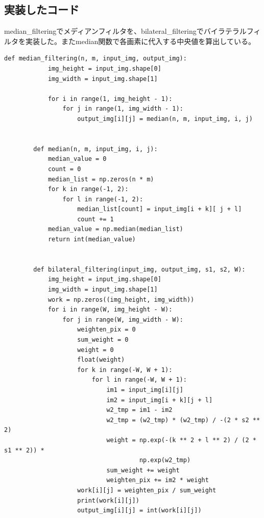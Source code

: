 \documentclass[11pt,a4j]{jsarticle}
\begin{document}
    \subsection{実装したコード}
    median\_filteringでメディアンフィルタを、bilateral\_filteringでバイラテラルフィルタを実装した。またmedian関数で各画素に代入する中央値を算出している。
    \begin{lstlisting}[basicstyle=\ttfamily\footnotesize, frame=single]
        def median_filtering(n, m, input_img, output_img):
            img_height = input_img.shape[0]
            img_width = input_img.shape[1]

            for i in range(1, img_height - 1):
                for j in range(1, img_width - 1):
                    output_img[i][j] = median(n, m, input_img, i, j)


        def median(n, m, input_img, i, j):
            median_value = 0
            count = 0
            median_list = np.zeros(n * m)
            for k in range(-1, 2):
                for l in range(-1, 2):
                    median_list[count] = input_img[i + k][ j + l]
                    count += 1
            median_value = np.median(median_list)
            return int(median_value)


        def bilateral_filtering(input_img, output_img, s1, s2, W):
            img_height = input_img.shape[0]
            img_width = input_img.shape[1]
            work = np.zeros((img_height, img_width))
            for i in range(W, img_height - W):
                for j in range(W, img_width - W):
                    weighten_pix = 0
                    sum_weight = 0
                    weight = 0
                    float(weight)
                    for k in range(-W, W + 1):
                        for l in range(-W, W + 1):
                            im1 = input_img[i][j]
                            im2 = input_img[i + k][j + l]
                            w2_tmp = im1 - im2
                            w2_tmp = (w2_tmp) * (w2_tmp) / -(2 * s2 ** 2)
                            weight = np.exp(-(k ** 2 + l ** 2) / (2 * s1 ** 2)) *
                                     np.exp(w2_tmp)
                            sum_weight += weight
                            weighten_pix += im2 * weight
                    work[i][j] = weighten_pix / sum_weight
                    print(work[i][j])
                    output_img[i][j] = int(work[i][j])
    \end{lstlisting}
\end{document}

